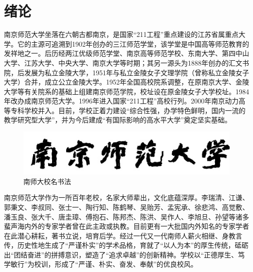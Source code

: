 \documentclass[UTF8,a4paper,twoside,zihao=-4]{ctexrep}
\theoremstyle{nonumberplain}
\begin{document}



\tableofcontents\newpage\mbox{}\thispagestyle{empty}\newpage
\clearpage{}
\chapter{绪论}
南京师范大学坐落在六朝古都南京，是国家“211工程”重点建设的江苏省属重点大学。它的主源可追溯到1902年创办的三江师范学堂，该学堂是中国高等师范教育的发祥地之一。后历经两江优级师范学堂、南京高等师范学校、东南大学、第四中山大学、江苏大学、中央大学、南京大学等时期；其另一源头为1888年创办的汇文书院，后发展为私立金陵大学，1951年与私立金陵女子文理学院（曾称私立金陵女子大学）合并，成立公立金陵大学。1952年全国高校院系调整，在原南京大学、金陵大学等有关院系的基础上组建南京师范学院，校址设在原金陵女子大学校址。1984年改办成南京师范大学。1996年进入国家``211工程''高校行列。2000年南京动力高等专科学校并入。目前，学校正着力建设“综合性强，办学特色鲜明，国内一流的教学研究型大学”，并为今后建成“有国际影响的高水平大学”奠定坚实基础。
\begin{figure}[htb]
    \centering
    \includegraphics[scale=.6]{cover/nnu_caligraphy.png}
    \caption{南师大校名书法}\label{fig:caligraphy}
\end{figure}

南京师范大学作为一所百年老校，名家大师辈出，文化底蕴深厚。李瑞清、江谦、郭秉文、李叔同、张士一、陶行知、陈鹤琴、吴贻芳、孟宪承、徐悲鸿、高觉敷、潘玉良、张大千、唐圭璋、傅抱石、陈邦杰、陈洪、吴作人、李旭旦、孙望等诸多蜚声海内外的专家学者曾在此主政或执教。目前更有一大批国内外知名的专家学者在此潜心耕耘，著书立说，培育后学。经过一代又一代南师人薪火相继、身教言传，历史性地生成了``严谨朴实''的学术品格，育就了“以人为本”的厚生传统，砥砺出``团结奋进''的拼搏意识，塑造了``追求卓越''的创新精神。学校以``正德厚生、笃学敏行''为校训，形成了``严谨、朴实、奋发、奉献''的优良校风。
　　　
\end{document}
